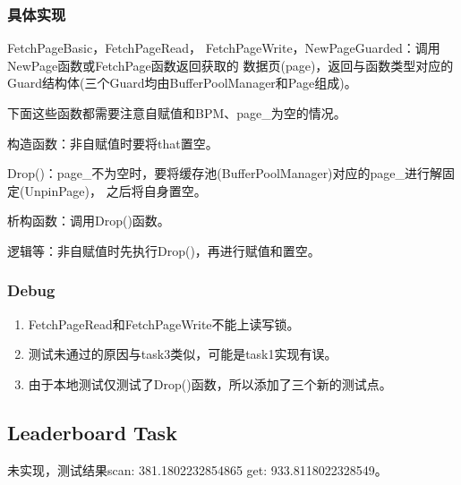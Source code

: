 \documentclass[a4paper]{article}
\begin{document}
\subsubsection{具体实现}

FetchPageBasic，FetchPageRead，
FetchPageWrite，NewPageGuarded：调用NewPage函数或FetchPage函数返回获取的
数据页(page)，返回与函数类型对应的Guard结构体(三个Guard均由BufferPoolManager和Page组成)。

下面这些函数都需要注意自赋值和BPM、page\_为空的情况。

构造函数：非自赋值时要将that置空。

Drop()：page\_不为空时，要将缓存池(BufferPoolManager)对应的page\_进行解固定(UnpinPage)，
之后将自身置空。

析构函数：调用Drop()函数。

逻辑等：非自赋值时先执行Drop()，再进行赋值和置空。

\subsubsection{Debug}

\begin{enumerate}
   \item FetchPageRead和FetchPageWrite不能上读写锁。
   \item 测试未通过的原因与task3类似，可能是task1实现有误。
   \item 由于本地测试仅测试了Drop()函数，所以添加了三个新的测试点。
\end{enumerate}

\subsection{Leaderboard Task}

未实现，测试结果scan: 381.1802232854865  get: 933.8118022328549。

\newpage

 
\end{document}

